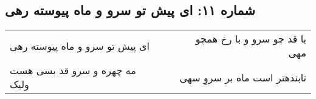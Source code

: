 \begin{center}
\section*{شماره ۱۱: ای پیش تو سرو و ماه پیوسته رهی}
\label{sec:011}
\begin{longtable}{l p{0.5cm} r}
ای پیش تو سرو و ماه پیوسته رهی
&&
با قد چو سرو و با رخ همچو مهی
\\
مه چهره و سرو قد بسی هست ولیک
&&
تابندهتر است ماه بر سروِ سهی
\\
\end{longtable}
\end{center}
